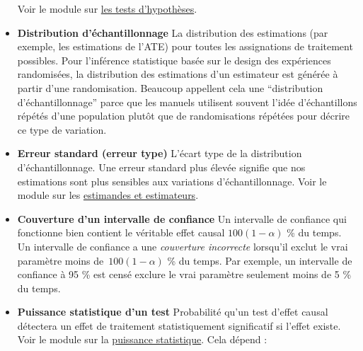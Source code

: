 \documentclass[
  12pt,
]{book}
\begin{document}
\begin{itemize}
  Voir le module sur \href{hypothesis-testing.html}{les tests d'hypothèses}.
\item
  \textbf{Distribution d'échantillonnage} La distribution des estimations (par exemple, les estimations de l'ATE) pour toutes les assignations de traitement possibles.
  Pour l'inférence statistique basée sur le design des expériences randomisées, la distribution des estimations d'un estimateur est générée à partir d'une randomisation.
  Beaucoup appellent cela une ``distribution d'échantillonnage'' parce que les manuels utilisent souvent l'idée d'échantillons répétés d'une population plutôt que de randomisations répétées pour décrire ce type de variation.
\item
  \textbf{Erreur standard (erreur type)} L'écart type de la distribution d'échantillonnage. Une erreur standard plus élevée signifie que nos estimations sont plus sensibles aux variations d'échantillonnage.
  Voir le module sur les \href{estimands-and-estimateurs.html}{estimandes et estimateurs}.
\item
  \textbf{Couverture d'un intervalle de confiance} Un intervalle de confiance qui fonctionne bien contient le véritable effet causal \(100 ( 1 - \alpha)\) \% du temps.
  Un intervalle de confiance a une \emph{couverture incorrecte} lorsqu'il exclut le vrai paramètre moins de~\(100 (1 - \alpha)\) \% du temps.
  Par exemple, un intervalle de confiance à 95 \% est censé exclure le vrai paramètre seulement moins de 5 \% du temps.
\item
  \textbf{Puissance statistique d'un test} Probabilité qu'un test d'effet causal détectera un effet de traitement statistiquement significatif si l'effet existe.
  Voir le module sur la \href{statistical-power-and-design-diagnosands.html}{puissance statistique}.
  Cela dépend :


\end{itemize}
\end{document}
